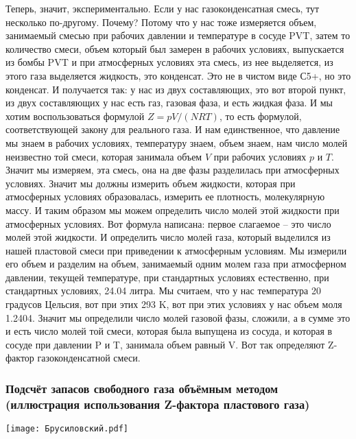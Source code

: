 \documentclass[main.tex]{subfiles}
\begin{document}
Теперь, значит, экспериментально.
Если у нас газоконденсатная смесь, тут несколько по-другому.
Почему?
Потому что у нас тоже измеряется объем, занимаемый смесью при рабочих давлении и температуре в сосуде PVT, затем то количество смеси, объем который был замерен в рабочих условиях, выпускается из бомбы PVT и при атмосферных условиях эта смесь, из нее выделяется, из этого газа выделяется жидкость, это конденсат.
Это не в чистом виде С5+, но это конденсат.
И получается так: у нас из двух составляющих, это вот второй пункт, из двух составляющих у нас есть газ, газовая фаза, и есть жидкая фаза.
И мы хотим воспользоваться формулой $Z=pV/(NRT)$, то есть формулой, соответствующей закону для реального газа.
И нам единственное, что давление мы знаем в рабочих условиях, температуру знаем, объем знаем, нам число молей неизвестно той смеси, которая занимала объем $V$ при рабочих условиях $p$ и $T$.
Значит мы измеряем, эта смесь, она на две фазы разделилась при атмосферных условиях.
Значит мы должны измерить объем жидкости, которая при атмосферных условиях образовалась, измерить ее плотность, молекулярную массу.
И таким образом мы можем определить число молей этой жидкости при атмосферных условиях.
Вот формула написана: первое слагаемое -- это число молей этой жидкости.
И определить число молей газа, который выделился из нашей пластовой смеси при приведении к атмосферным условиям.
Мы измерили его объем и разделим на объем, занимаемый одним молем газа при атмосферном давлении, текущей температуре, при стандартных условиях естественно, при стандартных условиях, 24.04 литра.
Мы считаем, что у нас температура 20 градусов Цельсия, вот при этих 293 K, вот при этих условиях у нас объем моля 1.2404.
Значит мы определили число молей газовой фазы, сложили, а в сумме это и есть число молей той смеси, которая была выпущена из сосуда, и которая в сосуде при давлении P и T, занимала объем равный V.
Вот так определяют Z-фактор газоконденсатной смеси.

\subsubsection{Подсчёт запасов свободного газа объёмным методом (иллюстрация использования Z-фактора пластового газа)}

\begin{center}
\texttt{[image: Брусиловский.pdf]}
\end{center}
\end{document}
